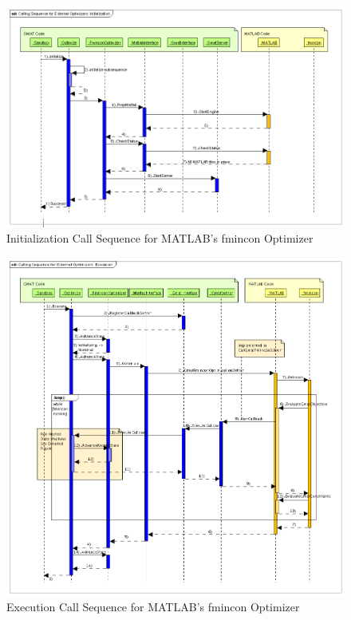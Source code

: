\begin{subfigures}
\begin{figure}[htb]
\begin{center}
\includegraphics[460,301]{Images/CallingSequenceforExternalOptimizersInitialization.png}
\caption{\label{figure:ExternalOptimizationCallSequenceInit}Initialization Call Sequence for
MATLAB's fmincon Optimizer}
\end{center}
\end{figure}

\begin{figure}
\begin{center}
\includegraphics[460,460]{Images/CallingSequenceforExternalOptimizersExecution.png}
\caption{\label{figure:ExternalOptimizationCallSequenceExec}Execution Call Sequence for MATLAB's
fmincon Optimizer}
\end{center}
\end{figure}


\end{subfigures}
